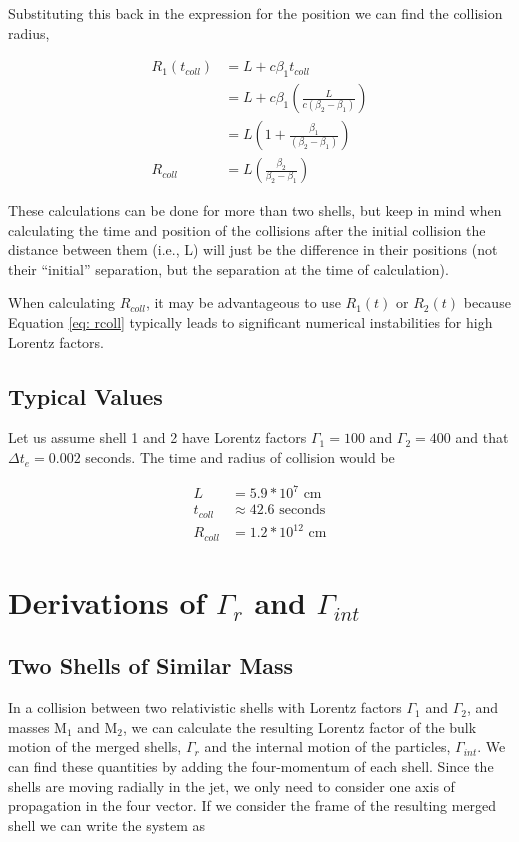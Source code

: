 \documentclass[linenumbers,twocolumn]{aastex631}
\begin{document}
\begin{appendix}
Substituting this back in the expression for the position we can find the collision radius, 

\begin{align}
	R_1(t_{coll}) &= L + c\beta_1 t_{coll} \\
	&= L+c\beta_1\left(\frac{L}{c(\beta_2-\beta_1)}\right) \\
	&= L\left(1+\frac{\beta_1}{(\beta_2-\beta_1)}\right)\\
	R_{coll} &= L\left(\frac{\beta_2}{\beta_2-\beta_1}\right) \label{eq: rcoll}
\end{align}

These calculations can be done for more than two shells, but keep in mind when calculating the time and position of the collisions after the initial collision the distance between them (i.e., L) will just be the difference in their positions (not their ``initial'' separation, but the separation at the time of calculation).

When calculating $R_{coll}$, it may be advantageous to use $R_1(t)$ or $R_2(t)$
because Equation \ref{eq: rcoll} typically leads to significant numerical instabilities for high Lorentz factors.

\subsection{Typical Values}

Let us assume shell 1 and 2 have Lorentz factors $\Gamma_1=100$ and $\Gamma_2=400$ and that $\Delta t_e = 0.002$ seconds. The time and radius of collision would be

\begin{align}
	L &= 5.9 * 10^7 \text{ cm} \\ 
	t_{coll} &\approx 42.6 \text{ seconds}\\
	R_{coll} &= 1.2*10^{12} \text{ cm}
\end{align}


\section[Derivations of Gamma_r and Gamma_int]{Derivations of $\Gamma_r$ and $\Gamma_{int}$}

\subsection{Two Shells of Similar Mass}

In a collision between two relativistic shells with Lorentz factors $\Gamma_1$ and $\Gamma_2$, and masses M$_1$ and M$_2$, we can calculate the resulting Lorentz factor of the bulk motion of the merged shells, $\Gamma_r$ and the internal motion of the particles, $\Gamma_{int}$. We can find these quantities by adding the four-momentum of each shell. Since the shells are moving radially in the jet, we only need to consider one axis of propagation in the four vector. If we consider the frame of the resulting merged shell we can write the system as


\end{appendix}
\end{document}
